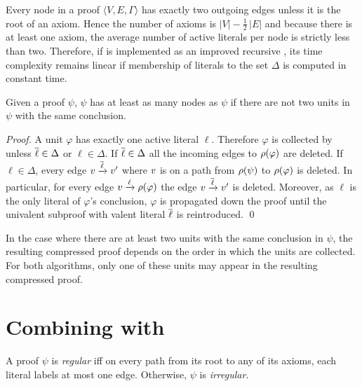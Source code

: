 \documentclass{llncs}
\begin{document}
Every node in a proof $\langle V, E, \Gamma \rangle$ has exactly two outgoing edges unless it is the
root of an axiom. Hence the number of axioms is $|V| - \frac{1}{2}\,|E|$ and because there is at
least one axiom, the average number of active literals per node is strictly less than two.
Therefore, if {\LowerUnivalents} is implemented as an improved recursive , its time
complexity remains linear if membership of literals to the set $\Delta$ is computed in constant
time.

\begin{proposition} \label{prop:compression}
Given a proof $\psi$,
{\LowerUnits\FuncSty{(}$\psi$\FuncSty{)}}
has at least as many nodes as 
{\LowerUnivalents\FuncSty{(}$\psi$\FuncSty{)}}
if there are not two units in $\psi$ with the same conclusion.
\end{proposition}

\begin{proof}
A unit $\varphi$ has exactly one active literal $\ell$. Therefore $\varphi$ is collected by
{\LowerUnivalents} unless $\overline{\ell} \in \Delta$ or $\ell \in \Delta$. If $\overline{\ell} \in \Delta$
all the incoming edges to $\rho(\varphi)$ are deleted. If $\ell \in \Delta$, every edge
$v \xrightarrow{\overline{\ell}} v'$ where $v$ is on a path from $\rho(\psi)$ to $\rho(\varphi)$
is deleted.
In particular, for every edge $v \xrightarrow{\ell} \rho(\varphi)$ the edge $v
\xrightarrow{\overline{\ell}} v'$ is deleted.  Moreover, as $\ell$ is the only literal of $\varphi$'s
conclusion, $\varphi$ is propagated down the proof until the univalent subproof with valent literal
$\overline{\ell}$ is reintroduced. \qed
\end{proof}

In the case where there are at least two units with the same conclusion in $\psi$, the resulting
compressed proof depends on the order in which the units are collected. For both algorithms, only one of these
units may appear in the resulting compressed proof.



\section{Combining {\LowerUnivalents} with {\RPI}} \label{sec:LUnivRPI}

\begin{definition}
A proof $\psi$ is \emph{regular} iff on every path from its root to any of its axioms, each literal
labels at most one edge. Otherwise, $\psi$ is \emph{irregular}.
\end{definition}
\end{document}
